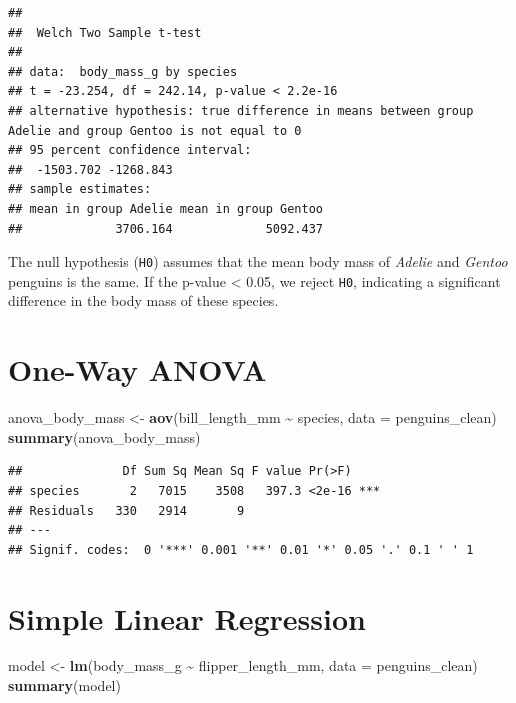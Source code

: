 \documentclass[
]{book}
\newenvironment{Shaded}{\begin{snugshade}}{\end{snugshade}}
\newcommand{\AttributeTok}[1]{\textcolor[rgb]{0.13,0.29,0.53}{#1}}
\newcommand{\FunctionTok}[1]{\textcolor[rgb]{0.13,0.29,0.53}{\textbf{#1}}}
\newcommand{\NormalTok}[1]{#1}
\newcommand{\OtherTok}[1]{\textcolor[rgb]{0.56,0.35,0.01}{#1}}
\newcommand{\SpecialCharTok}[1]{\textcolor[rgb]{0.81,0.36,0.00}{\textbf{#1}}}
\begin{document}
\begin{verbatim}
## 
##  Welch Two Sample t-test
## 
## data:  body_mass_g by species
## t = -23.254, df = 242.14, p-value < 2.2e-16
## alternative hypothesis: true difference in means between group Adelie and group Gentoo is not equal to 0
## 95 percent confidence interval:
##  -1503.702 -1268.843
## sample estimates:
## mean in group Adelie mean in group Gentoo 
##             3706.164             5092.437
\end{verbatim}

The null hypothesis (\texttt{H0}) assumes that the mean body mass of \emph{Adelie} and \emph{Gentoo} penguins is the same. If the p-value \textless{} 0.05, we reject \texttt{H0}, indicating a significant difference in the body mass of these species.

\hypertarget{one-way-anova}{%
\section{One-Way ANOVA}\label{one-way-anova}}

\begin{Shaded}
\begin{Highlighting}[]
\NormalTok{anova\_body\_mass }\OtherTok{\textless{}{-}} \FunctionTok{aov}\NormalTok{(bill\_length\_mm }\SpecialCharTok{\textasciitilde{}}\NormalTok{ species, }\AttributeTok{data =}\NormalTok{ penguins\_clean)}
\FunctionTok{summary}\NormalTok{(anova\_body\_mass)}
\end{Highlighting}
\end{Shaded}

\begin{verbatim}
##              Df Sum Sq Mean Sq F value Pr(>F)    
## species       2   7015    3508   397.3 <2e-16 ***
## Residuals   330   2914       9                   
## ---
## Signif. codes:  0 '***' 0.001 '**' 0.01 '*' 0.05 '.' 0.1 ' ' 1
\end{verbatim}

\hypertarget{simple-linear-regression}{%
\section{Simple Linear Regression}\label{simple-linear-regression}}

\begin{Shaded}
\begin{Highlighting}[]
\NormalTok{model }\OtherTok{\textless{}{-}} \FunctionTok{lm}\NormalTok{(body\_mass\_g }\SpecialCharTok{\textasciitilde{}}\NormalTok{ flipper\_length\_mm, }\AttributeTok{data =}\NormalTok{ penguins\_clean)}
\FunctionTok{summary}\NormalTok{(model)}
\end{Highlighting}
\end{Shaded}
\end{document}

